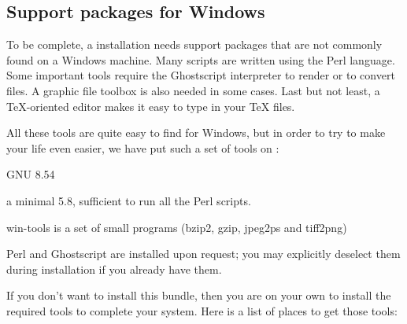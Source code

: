 \documentclass{article}
\begin{document}
\subsection{Support packages for Windows}
\label{sec:win-xemtex}

To be complete, a \TL installation needs support packages that are not
commonly found on a Windows machine.  Many scripts are written using the Perl
language. Some important tools require the Ghostscript \PS{} interpreter to
render or to convert files. A graphic file toolbox is also needed in some
cases. Last but not least, a \TeX-oriented editor makes it easy to type in
your \TeX{} files.

All these tools are quite easy to find for Windows, but in order to try to
make your life even easier, we have put such a set of tools on \TL:
\begin{itemize*}
\item GNU  8.54
\item a minimal  5.8, sufficient to run all the \TL{}
 Perl scripts.
\item win-tools is a set of small programs (bzip2, gzip, jpeg2ps
 and tiff2png)
\end{itemize*}

Perl and Ghostscript are installed upon request; you may explicitly
deselect them during installation if you already have them.

If you don't want to install this bundle, then you are on your own to
install the required tools to complete your \TL{} system. Here is a
list of places to get those tools:
\end{document}

